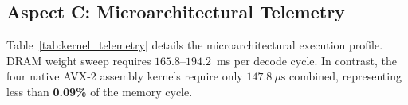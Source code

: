 \documentclass[journal,10pt,twocolumn]{article}
\theoremstyle{definition}
\begin{document}
\subsection{Aspect C: Microarchitectural Telemetry}

Table~\ref{tab:kernel_telemetry} details the microarchitectural execution profile. DRAM weight sweep requires $165.8\text{--}194.2$~ms per decode cycle. In contrast, the four native AVX-2 assembly kernels require only $147.8\ \mu\text{s}$ combined, representing less than \textbf{0.09\%} of the memory cycle.

\begin{table}[ht]
\centering
{}
\caption{Microarchitectural Latency Profile of AVX-2 Kernels.}
\label{tab:kernel_telemetry}
\end{table}
\end{document}
